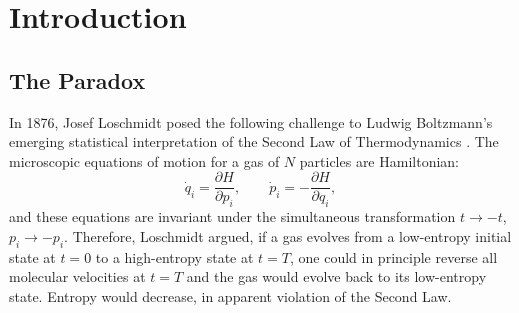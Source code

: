 \documentclass[twocolumn,10pt,a4paper]{article}
\theoremstyle{definition}
\theoremstyle{remark}
\begin{document}
\begin{abstract}
\vspace{0.2cm}
\noindent These results converge on a single physical picture: mass, time, identity, and partition count are four coordinatisations of a single quantity, related by unit conversions through the oscillator frequency, the speed of partition propagation, and Planck's constant. A mass spectrometer does not measure a pre-existing quantity called mass; it constitutes the mass-record through a sequence of operations whose intrinsic directionality is the arrow of time itself. Every reproducible mass spectrum is a written record of constitutive asymmetry. The Second Law of Thermodynamics emerges not as a statistical tendency or an empirical regularity but as the operational signature of what time is.

\vspace{0.3cm}
\noindent\textbf{Keywords:} Loschmidt's paradox, time-reversibility, mass spectrometry, partition counting, constitutive asymmetry, arrow of time, Second Law of Thermodynamics, irreversibility
\end{abstract}

\section{Introduction}
\label{sec:introduction}

\subsection{The Paradox}

In 1876, Josef Loschmidt posed the following challenge to Ludwig Boltzmann's emerging statistical interpretation of the Second Law of Thermodynamics \citep{loschmidt1876,loschmidt1877}. The microscopic equations of motion for a gas of $N$ particles are Hamiltonian:
\begin{equation}
    \dot{q}_i = \frac{\partial H}{\partial p_i}, \qquad \dot{p}_i = -\frac{\partial H}{\partial q_i},
    \label{eq:hamilton}
\end{equation}
and these equations are invariant under the simultaneous transformation $t \to -t$, $p_i \to -p_i$. Therefore, Loschmidt argued, if a gas evolves from a low-entropy initial state at $t = 0$ to a high-entropy state at $t = T$, one could in principle reverse all molecular velocities at $t = T$ and the gas would evolve back to its low-entropy state. Entropy would decrease, in apparent violation of the Second Law.
\end{document}
